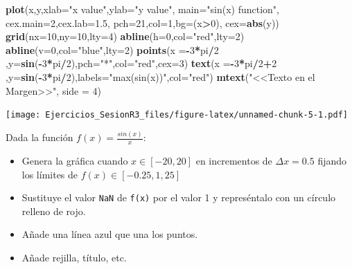 \documentclass[
]{article}
\newenvironment{Shaded}{\begin{snugshade}}{\end{snugshade}}
\newcommand{\DataTypeTok}[1]{\textcolor[rgb]{0.13,0.29,0.53}{#1}}
\newcommand{\DecValTok}[1]{\textcolor[rgb]{0.00,0.00,0.81}{#1}}
\newcommand{\FloatTok}[1]{\textcolor[rgb]{0.00,0.00,0.81}{#1}}
\newcommand{\KeywordTok}[1]{\textcolor[rgb]{0.13,0.29,0.53}{\textbf{#1}}}
\newcommand{\NormalTok}[1]{#1}
\newcommand{\OperatorTok}[1]{\textcolor[rgb]{0.81,0.36,0.00}{\textbf{#1}}}
\newcommand{\StringTok}[1]{\textcolor[rgb]{0.31,0.60,0.02}{#1}}
\providecommand{\tightlist}{%
  \setlength{\itemsep}{0pt}\setlength{\parskip}{0pt}}
\begin{document}
\begin{Shaded}
\begin{Highlighting}[]
\KeywordTok{plot}\NormalTok{(x,y,}\DataTypeTok{xlab=}\StringTok{"x value"}\NormalTok{,}\DataTypeTok{ylab=}\StringTok{"y value"}\NormalTok{,}
     \DataTypeTok{main=}\StringTok{"sin(x) function"}\NormalTok{,}
     \DataTypeTok{cex.main=}\DecValTok{2}\NormalTok{,}\DataTypeTok{cex.lab=}\FloatTok{1.5}\NormalTok{,}
     \DataTypeTok{pch=}\DecValTok{21}\NormalTok{,}\DataTypeTok{col=}\DecValTok{1}\NormalTok{,}\DataTypeTok{bg=}\NormalTok{(x}\OperatorTok{>}\DecValTok{0}\NormalTok{),}
     \DataTypeTok{cex=}\KeywordTok{abs}\NormalTok{(y))}
\KeywordTok{grid}\NormalTok{(}\DataTypeTok{nx=}\DecValTok{10}\NormalTok{,}\DataTypeTok{ny=}\DecValTok{10}\NormalTok{,}\DataTypeTok{lty=}\DecValTok{4}\NormalTok{) }
\KeywordTok{abline}\NormalTok{(}\DataTypeTok{h=}\DecValTok{0}\NormalTok{,}\DataTypeTok{col=}\StringTok{"red"}\NormalTok{,}\DataTypeTok{lty=}\DecValTok{2}\NormalTok{)}
\KeywordTok{abline}\NormalTok{(}\DataTypeTok{v=}\DecValTok{0}\NormalTok{,}\DataTypeTok{col=}\StringTok{"blue"}\NormalTok{,}\DataTypeTok{lty=}\DecValTok{2}\NormalTok{)}
\KeywordTok{points}\NormalTok{(}\DataTypeTok{x =}\OperatorTok{-}\DecValTok{3}\OperatorTok{*}\NormalTok{pi}\OperatorTok{/}\DecValTok{2}\NormalTok{ ,}\DataTypeTok{y=}\KeywordTok{sin}\NormalTok{(}\OperatorTok{-}\DecValTok{3}\OperatorTok{*}\NormalTok{pi}\OperatorTok{/}\DecValTok{2}\NormalTok{),}\DataTypeTok{pch=}\StringTok{"*"}\NormalTok{,}\DataTypeTok{col=}\StringTok{"red"}\NormalTok{,}\DataTypeTok{cex=}\DecValTok{3}\NormalTok{)}
\KeywordTok{text}\NormalTok{(}\DataTypeTok{x =}\OperatorTok{-}\DecValTok{3}\OperatorTok{*}\NormalTok{pi}\OperatorTok{/}\DecValTok{2}\OperatorTok{+}\DecValTok{2}\NormalTok{ ,}\DataTypeTok{y=}\KeywordTok{sin}\NormalTok{(}\OperatorTok{-}\DecValTok{3}\OperatorTok{*}\NormalTok{pi}\OperatorTok{/}\DecValTok{2}\NormalTok{),}\DataTypeTok{labels=}\StringTok{"max(sin(x))"}\NormalTok{,}\DataTypeTok{col=}\StringTok{"red"}\NormalTok{)}
\KeywordTok{mtext}\NormalTok{(}\StringTok{"<<Texto en el Margen>>"}\NormalTok{, }\DataTypeTok{side =} \DecValTok{4}\NormalTok{)}
\end{Highlighting}
\end{Shaded}

\texttt{[image: Ejercicios\_SesionR3\_files/figure-latex/unnamed-chunk-5-1.pdf]}

Dada la función \(f(x)=\frac{sin(x)}{x}\):

\begin{itemize}
\tightlist
\item
  Genera la gráfica cuando \(x\in[-20,20]\) en incrementos de
  \(\Delta x=0.5\) fijando los límites de \(f(x)\in[-0.25,1,25]\)
\item
  Sustituye el valor \texttt{NaN} de \texttt{f(x)} por el valor 1 y
  represéntalo con un círculo relleno de rojo.
\item
  Añade una línea azul que una los puntos.
\item
  Añade rejilla, título, etc.
\end{itemize}
\end{document}
